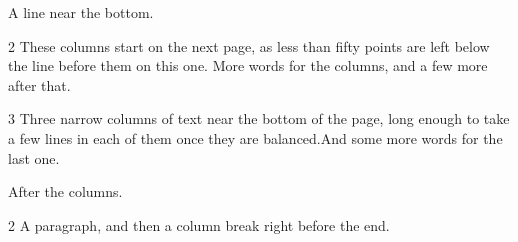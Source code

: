 \documentclass{article}
\begin{document}
\vspace*{480pt}
A line near the bottom.

\begin{multicols}{2}
These columns start on the next page, as less than fifty points are left below the line before them on this one.
\columnbreak[3]
More words for the columns, and a few more after that.
\end{multicols}

\vspace*{440pt}
\begin{multicols}{3}
Three narrow columns of text near the bottom of the page, long enough to take a few lines in each of them once they are
balanced.\columnbreak[0] And some more words for the last one.
\end{multicols}
After the columns.

\begin{multicols}{2}
A paragraph, and then a column break right before the end.

\columnbreak
\end{multicols}
\end{document}
